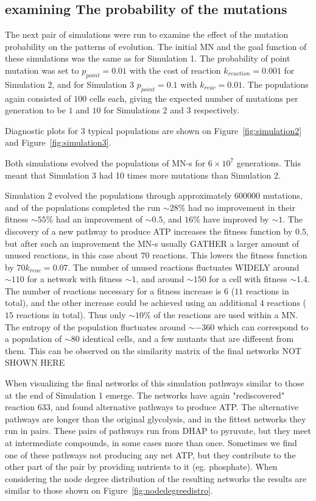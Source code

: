 \documentclass[a4paper,12pt]{article}
\begin{document}
\subsection{examining The probability of the mutations}
\label{sub:the_probability_of_the_mutations}

The next pair of simulations were run to examine the effect of the mutation probability on the patterns of evolution. The initial MN and the goal function of these simulations was the same as for Simulation 1. The probability of point mutation was set to $p_{point}=0.01$ with the cost of reaction $k_{reaction}=0.001$ for Simulation 2, and for Simulation 3 $p_{point}=0.1$ with $k_{reac}=0.01$. The populations again consisted of $100$ cells each, giving the expected number of mutations per generation to be $1$ and $10$ for Simulations 2 and 3 respectively. 

Diagnostic plots for $3$ typical populations are shown on Figure~\ref{fig:simulation2} and Figure~\ref{fig:simulation3}.

Both simulations evolved the populations of MN-s for $6\times 10^7$ generations. This meant that Simulation 3 had 10 times more mutations than Simulation 2. 

Simulation 2 evolved the populations through approximately $600 000$ mutations, and of the populations completed the run $\sim 28 \%$ had no improvement in their fitness $\sim 55 \%$ had an improvement of $\sim 0.5$, and $16 \%$ have improved by $\sim 1$. The discovery of a new pathway to produce ATP increases the fitness function by $0.5$, but after such an improvement the MN-s usually GATHER a larger amount of unused reactions, in this case about $70$ reactions. This lowers the fitness function by $70 k_{reac}=0.07$. The number of unused reactions fluctuates WIDELY around $\sim 110$ for a network with fitness $\sim 1$, and around $\sim 150$ for a cell with fitness $\sim 1.4$. The number of reactions necessary for a fitness increase is $6$ ($11$ reactions in total), and the other increase could be achieved using an additional $4$ reactions ($15$ reactions in total). Thus only $\sim 10\%$ of the reactions are used within a MN.  The entropy of the population fluctuates around $\sim -360$ which can correspond to a population of $\sim 80$ identical cells, and a few mutants that are different from them. This can be observed on the similarity matrix of the final networks NOT SHOWN HERE

When visualizing the final networks of this simulation pathways similar to those at the end of Simulation 1 emerge. The networks have again "rediscovered" reaction $633$, and found alternative pathways to produce ATP. The alternative pathways are longer than the original glycolysis, and in the fittest networks they run in pairs. These pairs of pathways run from DHAP to pyruvate, but they meet at intermediate compounds, in some cases more than once. Sometimes we find one of these pathways not producing any net ATP, but they contribute to the other part of the pair by providing nutrients to it (eg. phosphate). When considering the node degree distribution of the resulting networks the results are similar to those shown on Figure~\ref{fig:nodedegreedistro}. 
\end{document}
